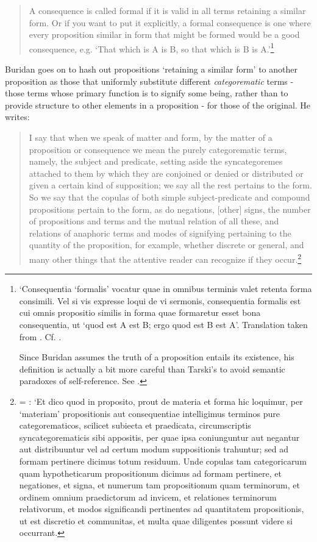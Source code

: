 \documentclass[a4paper, 11pt]{article}
\begin{document}
\begin{quote}
A consequence is called formal if it is valid in all terms retaining a similar form. Or if you want to put it explicitly, a formal consequence is one where every proposition similar in form that might be formed would be a good consequence, e.g. `That which is A is B, so that which is B is A.'\footnote{\autocite[23-24]{BuridanTC}`Consequentia `formalis' vocatur quae in omnibus terminis valet retenta forma consimili. Vel si vis expresse loqui de vi sermonis, consequentia formalis est cui omnis propositio similis in forma quae formaretur esset bona consequentia, ut `quod est A est B; ergo quod est B est A'. Translation taken from \autocite[68]{Buridan2015}. Cf. \autocite[105]{Pseudo-Scotus1891}. 

Since Buridan assumes the truth of a proposition entails its existence, his definition is actually a bit more careful than Tarski's to avoid semantic paradoxes of self-reference. See \autocite{Klima2004,DutilhNovaes2005}.}
\end{quote}

Buridan goes on to hash out propositions `retaining a similar form' to another proposition as those that uniformly substitute different \emph{categorematic} terms - those terms whose primary function is to signify some being, rather than to provide structure to other elements in a proposition - for those of the original. He writes: 
\begin{quote}
	I say that when we speak of matter and form, by the matter of a proposition or consequence we mean the purely categorematic terms, namely, the subject and predicate, setting aside the syncategoremes attached to them by which they are conjoined or denied or distributed or given a certain kind of supposition; we say all the rest pertains to the form. So we say that the copulas of both simple subject-predicate and compound propositions pertain to the form, as do negations, [other] signs, the number of propositions and terms and the mutual relation of all these, and relations of anaphoric terms and modes of signifying pertaining to the quantity of the proposition, for example, whether discrete or general, and many other things that the attentive reader can recognize if they occur.\footnote{\autocite[74]{Buridan2015} = \autocite[30.7-18]{BuridanTC}: `Et dico quod in proposito, prout de materia et forma hic loquimur, per `materiam' propositionis aut consequentiae intelligimus terminos pure categorematicos, scilicet subiecta et praedicata, circumscriptis syncategorematicis sibi appositis, per quae ipsa coniunguntur aut negantur aut distribuuntur vel ad certum modum suppositionis trahuntur; sed ad formam pertinere dicimus totum residuum. Unde copulas tam categoricarum quam hypotheticarum propositionum dicimus ad formam pertinere, et negationes, et signa, et numerum tam propositionum quam terminorum, et ordinem omnium praedictorum ad invicem, et relationes terminorum relativorum, et modos significandi pertinentes  ad quantitatem propositionis, ut est discretio et communitas, et multa quae diligentes possunt videre si occurrant.}
\end{quote}  
\end{document}
